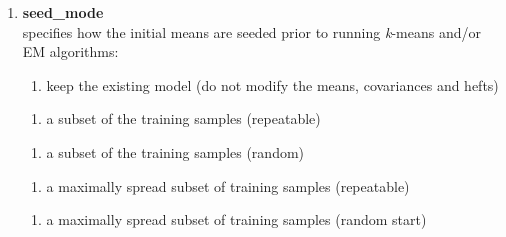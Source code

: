 \begin{enumerate}[{$\bullet$}]
\begin{small}
\begin{enumerate}[{-}]
\item
{\bf seed\_mode}\\
specifies how the initial means are seeded prior to running \mbox{{\it k}-means} and/or EM algorithms:
\begin{footnotesize}
\begin{enumerate}
\item keep the existing model (do not modify the means, covariances and hefts)
\end{enumerate}
\begin{enumerate}
\item a subset of the training samples (repeatable)
\end{enumerate}
\begin{enumerate}
\item a subset of the training samples (random)
\end{enumerate}
\begin{enumerate}
\item a maximally spread subset of training samples \mbox{(repeatable)}
\end{enumerate}
\begin{enumerate}
\item a maximally spread subset of training samples (random start) \\
\end{enumerate}
\end{footnotesize}



\end{enumerate}
\end{small}
\end{enumerate}
